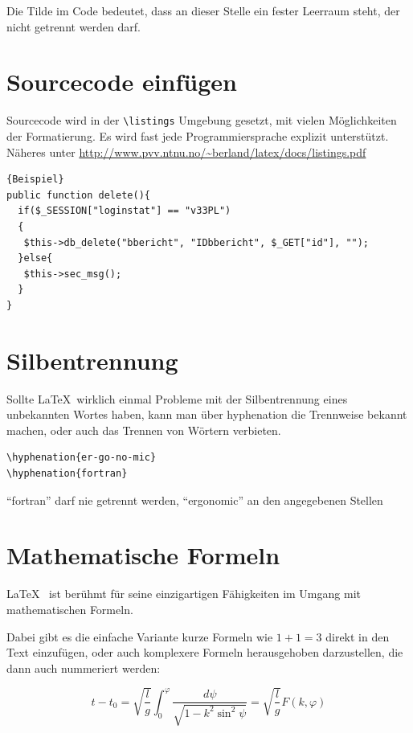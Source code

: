 Die Tilde im Code bedeutet, dass an dieser Stelle ein fester Leerraum steht, der nicht getrennt werden darf.




\section{Sourcecode einfügen}
Sourcecode wird in der \verb+\listings+ Umgebung gesetzt, mit vielen Möglichkeiten der Formatierung. Es wird fast jede Programmiersprache explizit unterstützt. Näheres unter \url{http://www.pvv.ntnu.no/~berland/latex/docs/listings.pdf}


\begin{lstlisting}[caption=Dies ist ein PHP Beispiel]{Beispiel}
public function delete(){
  if($_SESSION["loginstat"] == "v33PL")
  {
   $this->db_delete("bbericht", "IDbbericht", $_GET["id"], "");
  }else{
   $this->sec_msg();
  }
}
\end{lstlisting} 	%




\section{Silbentrennung}

Sollte \LaTeX~wirklich einmal Probleme mit der Silbentrennung eines unbekannten Wortes haben, kann man über hyphenation
die Trennweise bekannt machen, oder auch das Trennen von Wörtern verbieten.
\begin{verbatim}
\hyphenation{er-go-no-mic} 		
\hyphenation{fortran}
\end{verbatim}
 "`fortran"' darf nie getrennt werden, "`ergonomic"' an den angegebenen Stellen






\section{Mathematische Formeln}
\LaTeX~ ist berühmt für seine einzigartigen Fähigkeiten im Umgang mit mathematischen Formeln.

Dabei gibt es die einfache Variante kurze Formeln wie $1+1=3$ direkt in den Text einzufügen, oder auch komplexere Formeln herausgehoben darzustellen, die dann auch nummeriert werden:

\begin{equation}%
t-t_{0}=\sqrt{\frac{l}{g}}\int_{0}^{\varphi}{\frac{d\psi}{\sqrt{1-k^{2}\sin^{2} {\psi}}}} = \sqrt{\frac{l}{g}} F(k,\varphi)
\end{equation}%

